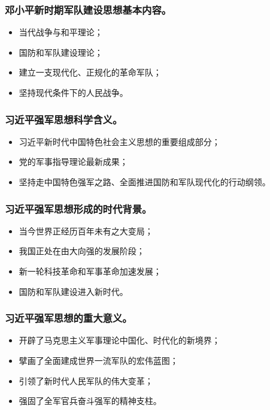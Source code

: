 \documentclass{article}
\begin{document}
\subsubsection{邓小平新时期军队建设思想基本内容。}
\begin{itemize}
    \item 当代战争与和平理论；
    \item 国防和军队建设理论；
    \item 建立一支现代化、正规化的革命军队；
    \item 坚持现代条件下的人民战争。
\end{itemize}

\subsubsection{习近平强军思想科学含义。}
\begin{itemize}
    \item 习近平新时代中国特色社会主义思想的重要组成部分；
    \item 党的军事指导理论最新成果；
    \item 坚持走中国特色强军之路、全面推进国防和军队现代化的行动纲领。
\end{itemize}

\subsubsection{习近平强军思想形成的时代背景。}
\begin{itemize}
    \item 当今世界正经历百年未有之大变局；
    \item 我国正处在由大向强的发展阶段；
    \item 新一轮科技革命和军事革命加速发展；
    \item 国防和军队建设进入新时代。
\end{itemize}

\subsubsection{习近平强军思想的重大意义。}
\begin{itemize}
    \item 开辟了马克思主义军事理论中国化、时代化的新境界；
    \item 擘画了全面建成世界一流军队的宏伟蓝图；
    \item 引领了新时代人民军队的伟大变革；
    \item 强固了全军官兵奋斗强军的精神支柱。
\end{itemize}
\end{document}
